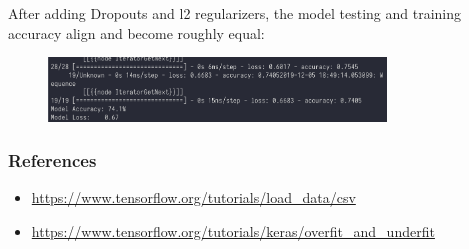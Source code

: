 \documentclass{article}
\begin{document}
After adding Dropouts and l2 regularizers, the model testing and training accuracy align and become roughly equal:

\begin{figure}[h!]
  \includegraphics[width=0.8\textwidth]{p31.png}
  \centering
\end{figure}

\newpage

\subsubsection*{References}

\begin{itemize}
  \item \href{https://www.tensorflow.org/tutorials/load\_data/csv}{https://www.tensorflow.org/tutorials/load\_data/csv}
  \item \href{https://www.tensorflow.org/tutorials/keras/overfit\_and\_underfit}{https://www.tensorflow.org/tutorials/keras/overfit\_and\_underfit}
\end{itemize}
\end{document}

